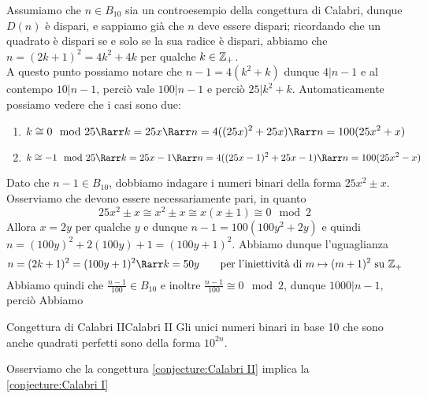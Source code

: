\documentclass{article}
\begin{document}
Assumiamo che $n \in B_{10}$ sia un controesempio della congettura di Calabri, dunque $D(n)$ è dispari, e sappiamo già che $n$ deve essere dispari; ricordando che un quadrato è dispari se e solo se la sua radice è dispari, abbiamo che $n = (2k+1)^2 = 4k^2 + 4k$ per qualche $k \in \mathbb{Z}_+$.\\
A questo punto possiamo notare che $n-1 = 4(k^2 + k)$ dunque $4|n-1$ e al contempo $10| n-1$, perciò vale $100|n-1$ e perciò $25 | k^2 + k$. Automaticamente possiamo vedere che i casi sono due:
\begin{enumerate}
    \item \[ k \cong 0 \mod 25  \Rarr k = 25x \Rarr n = 4((25x)^2 + 25x) \Rarr n = 100(25x^2 + x )\]
    \item \[ k \cong -1 \mod 25 \Rarr k = 25x-1 \Rarr n = 4((25x-1)^2 + 25x - 1) \Rarr n = 100(25x^2 - x) \]
\end{enumerate}

Dato che $n-1 \in B_{10}$, dobbiamo indagare i numeri binari della forma $25x^2 \pm x$. Osserviamo che devono essere necessariamente pari, in quanto
\[ 25x^2 \pm x \cong x^2 \pm x \cong x(x \pm 1) \cong 0 \mod 2 \]
Allora $x = 2y$ per qualche $y$ e dunque $n-1 = 100(100y^2 + 2y)$ e quindi $n = (100y)^2 + 2(100y) + 1 = (100y +1)^2$. Abbiamo dunque l'uguaglianza
\[ n = (2k+1)^2 = (100y + 1)^2 \Rarr k = 50y \qquad \text{per l'iniettività di } m \mapsto (m+1)^2 \text{ su } \Z_+\] 
Abbiamo quindi che $\frac{n-1}{100} \in B_{10}$ e inoltre $\frac{n-1}{100} \cong 0 \mod 2$, dunque 
$1000|n-1$, perciò Abbiamo

\begin{conjecture}{Congettura di Calabri II}{Calabri II}
    Gli unici numeri binari in base 10 che sono anche quadrati perfetti sono della forma $10^{2n}$.
\end{conjecture}
Osserviamo che la congettura \ref{conjecture:Calabri II} implica la \ref{conjecture:Calabri I}
\end{document}
